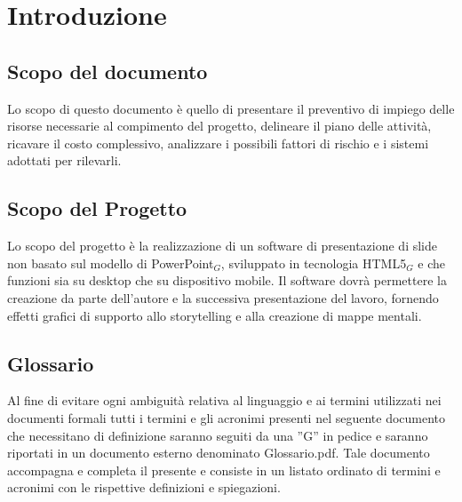 \section{Introduzione}

\subsection{Scopo del documento}
Lo scopo di questo documento è quello di presentare il preventivo di impiego delle risorse necessarie al compimento del progetto, delineare il piano delle attività, ricavare il costo complessivo, analizzare i possibili fattori di rischio e i sistemi adottati per rilevarli.

\subsection{Scopo del Progetto}
Lo scopo del progetto è la realizzazione di un software di presentazione di slide non basato sul modello di PowerPoint$_{G}$, sviluppato in tecnologia HTML5$_{G}$ e che funzioni sia su desktop che su dispositivo mobile. Il software dovrà permettere la creazione da parte dell'autore e la successiva presentazione del lavoro, fornendo effetti grafici di supporto allo storytelling e alla creazione di mappe mentali. 

\subsection{Glossario}
Al fine di evitare ogni ambiguità relativa al linguaggio e ai termini utilizzati nei documenti formali tutti i termini e gli acronimi presenti nel seguente documento che necessitano di definizione saranno seguiti da una ”G” in pedice e saranno riportati in un documento esterno denominato Glossario.pdf. Tale documento accompagna e completa il presente e consiste in un listato ordinato di termini e acronimi con le rispettive definizioni e spiegazioni.
